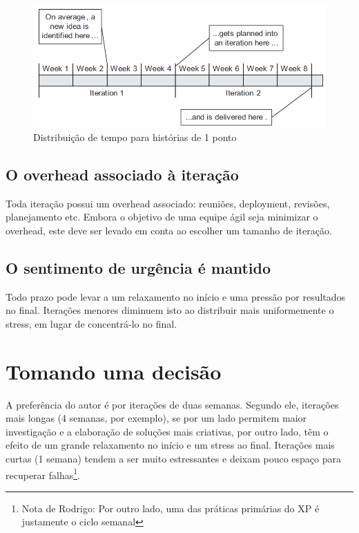 \documentclass[a4paper,abntfigtabnum,noindentfirst]{abnt}
\begin{document}
\begin{figure}
  \caption{Distribuição de tempo para histórias de 1 ponto}
  \label{tempo-para-uma-nova-ideia-virar-software}
  \begin{center}
  \includegraphics[scale=0.6]{tempo-para-uma-nova-ideia-virar-software}
  \end{center}
\end{figure}


\subsection{O overhead associado à iteração}

Toda iteração possui um overhead associado: reuniões, deployment, revisões, planejamento etc. Embora o objetivo de uma equipe ágil seja minimizar o overhead, este deve ser levado em conta ao escolher um tamanho de iteração.


\subsection{O sentimento de urgência é mantido}

Todo prazo pode levar a um relaxamento no início e uma pressão por resultados no final. Iterações menores diminuem isto ao distribuir mais uniformemente o stress, em lugar de concentrá-lo no final.


\section{Tomando uma decisão}

A preferência do autor é por iterações de duas semanas. Segundo ele, iterações mais longas (4 semanas, por exemplo), se por um lado permitem maior investigação e a elaboração de soluções mais criativas, por outro lado, têm o efeito de um grande relaxamento no início e um stress ao final. Iterações mais curtas (1 semana) tendem a ser muito estressantes e deixam pouco espaço para recuperar falhas\footnote{Nota de Rodrigo: Por outro lado, uma das práticas primárias do XP é justamente o ciclo semanal}.
\end{document}
